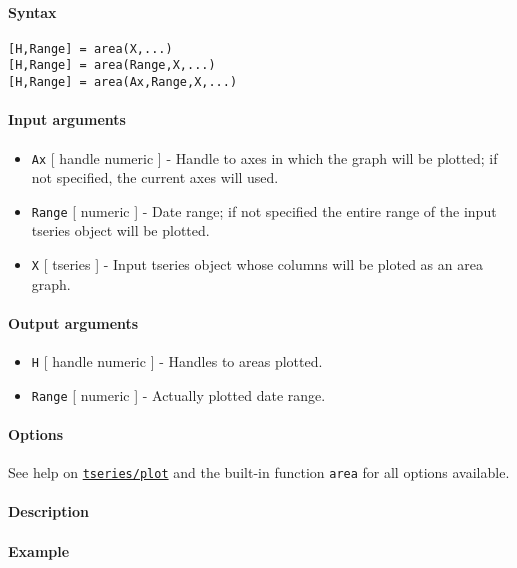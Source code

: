 


	\paragraph{Syntax}

\begin{verbatim}
[H,Range] = area(X,...)
[H,Range] = area(Range,X,...)
[H,Range] = area(Ax,Range,X,...)
\end{verbatim}

\paragraph{Input arguments}

\begin{itemize}
\item
  \texttt{Ax} {[} handle \textbar{} numeric {]} - Handle to axes in
  which the graph will be plotted; if not specified, the current axes
  will used.
\item
  \texttt{Range} {[} numeric {]} - Date range; if not specified the
  entire range of the input tseries object will be plotted.
\item
  \texttt{X} {[} tseries {]} - Input tseries object whose columns will
  be ploted as an area graph.
\end{itemize}

\paragraph{Output arguments}

\begin{itemize}
\item
  \texttt{H} {[} handle \textbar{} numeric {]} - Handles to areas
  plotted.
\item
  \texttt{Range} {[} numeric {]} - Actually plotted date range.
\end{itemize}

\paragraph{Options}

See help on \href{tseries/plot}{\texttt{tseries/plot}} and the built-in
function \texttt{area} for all options available.

\paragraph{Description}

\paragraph{Example}


